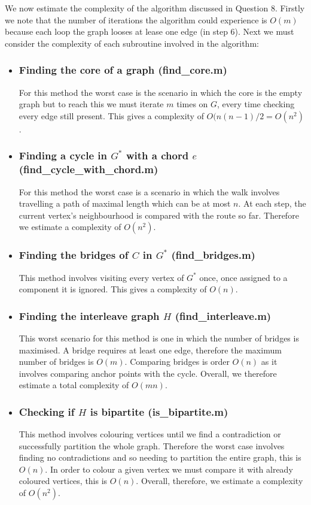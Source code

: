 \documentclass[a4paper]{article}
\begin{document}
We now estimate the complexity of the algorithm discussed in Question 8. Firstly we note that the number of iterations the algorithm could experience is $O(m)$ because each loop the graph looses at lease one edge (in step 6). Next we must consider the complexity of each subroutine involved in the algorithm:

\begin{itemize}
    \item 
    \subsubsection*{Finding the core of a graph (find\_core.m)}
    For this method the worst case is the scenario in which the core is the empty graph but to reach this we must iterate $m$ times on $G$, every time checking every edge still present. This gives a complexity of $O(n(n-1)/2 = O(n^2)$.
    \item
    \subsubsection*{Finding a cycle in $G^*$ with a chord $e$ (find\_cycle\_with\_chord.m)}
    For this method the worst case is a scenario in which the walk involves travelling a path of maximal length which can be at most $n$. At each step, the current vertex's neighbourhood is compared with the route so far. Therefore we estimate a complexity of $O(n^2)$.
    \item
    \subsubsection*{Finding the bridges of $C$ in $G^*$ (find\_bridges.m)}
    This method involves visiting every vertex of $G^*$ once, once assigned to a component it is ignored. This gives a complexity of $O(n)$.
    \item
    \subsubsection*{Finding the interleave graph $H$ (find\_interleave.m)}
    This worst scenario for this method is one in which the number of bridges is maximised. A bridge requires at least one edge, therefore the maximum number of bridges is $O(m)$. Comparing bridges is order $O(n)$ as it involves comparing anchor points with the cycle. Overall, we therefore estimate a total complexity of $O(mn)$.
    \item
    \subsubsection*{Checking if $H$ is bipartite (is\_bipartite.m)}
    This method involves colouring vertices until we find a contradiction or successfully partition the whole graph. Therefore the worst case involves finding no contradictions and so needing to partition the entire graph, this is $O(n)$. In order to colour a given vertex we must compare it with already coloured vertices, this is $O(n)$. Overall, therefore, we estimate a complexity of $O(n^2)$.
\end{itemize}
\end{document}
